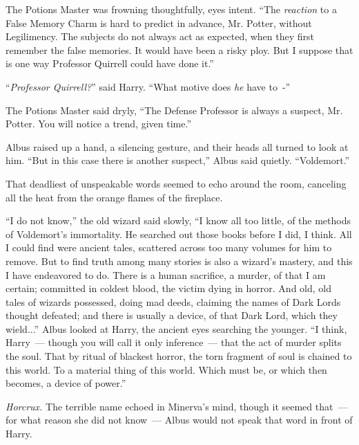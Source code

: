 The Potions Master was frowning thoughtfully, eyes intent. ``The \emph{reaction} to a False Memory Charm is hard to predict in advance, Mr. Potter, without Legilimency. The subjects do not always act as expected, when they first remember the false memories. It would have been a risky ploy. But I suppose that is one way Professor Quirrell could have done it.''

``\emph{Professor Quirrell?}'' said Harry. ``What motive does \emph{he} have to~-''

The Potions Master said dryly, ``The Defense Professor is always a suspect, Mr. Potter. You will notice a trend, given time.''

Albus raised up a hand, a silencing gesture, and their heads all turned to look at him. ``But in this case there is another suspect,'' Albus said quietly. ``Voldemort.''

That deadliest of unspeakable words seemed to echo around the room, canceling all the heat from the orange flames of the fireplace.

``I do not know,'' the old wizard said slowly, ``I know all too little, of the methods of Voldemort's immortality. He searched out those books before I did, I think. All I could find were ancient tales, scattered across too many volumes for him to remove. But to find truth among many stories is also a wizard's mastery, and this I have endeavored to do. There is a human sacrifice, a murder, of that I am certain; committed in coldest blood, the victim dying in horror. And old, old tales of wizards possessed, doing mad deeds, claiming the names of Dark Lords thought defeated; and there is usually a device, of that Dark Lord, which they wield...'' Albus looked at Harry, the ancient eyes searching the younger. ``I think, Harry~--- though you will call it only inference~--- that the act of murder splits the soul. That by ritual of blackest horror, the torn fragment of soul is chained to this world. To a material thing of this world. Which must be, or which then becomes, a device of power.''

\emph{Horcrux.} The terrible name echoed in Minerva's mind, though it seemed that~--- for what reason she did not know~--- Albus would not speak that word in front of Harry.

